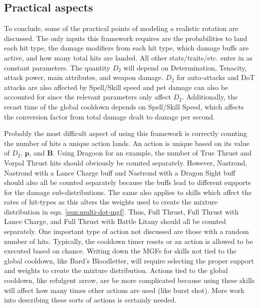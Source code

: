 \documentclass{article}
\begin{document}
        \subsection{Practical aspects}
        To conclude, some of the practical points of modeling a realistic rotation are discussed. The only inputs this framework requires are the probabilities to land each hit type, the damage modifiers from each hit type, which damage buffs are active, and how many total hits are landed. All other stats/traits/etc. enter in as constant parameters. The quantity $D_2$ will depend on Determination, Tenacity, attack power, main attributes, and weapon damage. $D_2$ for auto-attacks and DoT attacks are also affected by Spell/Skill speed and pet damage can also be accounted for since the relevant parameters only affect $D_2$. Additionally, the recast time of the global cooldown depends on Spell/Skill Speed, which affects the conversion factor from total damage dealt to damage per second.
        
        Probably the most difficult aspect of using this framework is correctly counting the number of hits a unique action lands. An action is unique based on its value of $D_2$, $\textbf{p}$, and $\textbf{B}$. Using Dragoon for an example, the number of True Thrust and Vorpal Thrust hits should obviously be counted separately. However, Nastrond, Nastrond with a Lance Charge buff and Nastrond with a Dragon Sight buff should also all be counted separately because the buffs lead to different supports for the damage sub-distributions. The same also applies to skills which affect the rates of hit-types as this alters the weights used to create the mixture distribution in eqn. \ref{eqn:multi-dot-mgf}. Thus, Full Thrust, Full Thrust with Lance Charge, and Full Thrust with Battle Litany should all be counted separately. One important type of action not discussed are those with a random number of hits. Typically, the cooldown timer resets or an action is allowed to be executed based on chance. Writing down the MGFs for skills not tied to the global cooldown, like Bard's Bloodletter, will require selecting the proper support and weights to create the mixture distribution. Actions tied to the global cooldown, like refulgent arrow, are be more complicated because using these skills will affect how many times other actions are used (like burst shot). More work into describing these sorts of actions is certainly needed.

    \newpage
    \newpage
\end{document}
